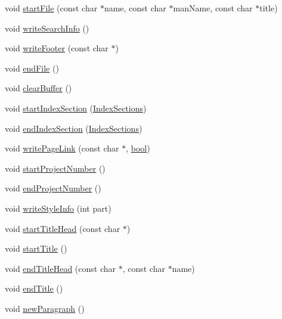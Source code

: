 \begin{DoxyCompactItemize}
\item 
void \hyperlink{class_r_t_f_generator_a8f2619c60318190461202909303cdd64}{start\+File} (const char $\ast$name, const char $\ast$man\+Name, const char $\ast$title)
\item 
void \hyperlink{class_r_t_f_generator_a2bbe7d3fc41e5d54ad3dd1549ead2a50}{write\+Search\+Info} ()
\item 
void \hyperlink{class_r_t_f_generator_a2f413cd0dd806141416ba6b3b165f6ff}{write\+Footer} (const char $\ast$)
\item 
void \hyperlink{class_r_t_f_generator_aa98dac9076dd84b77670d69a119e6745}{end\+File} ()
\item 
void \hyperlink{class_r_t_f_generator_ab9806cf1797d83c7f449598c690ed43d}{clear\+Buffer} ()
\item 
void \hyperlink{class_r_t_f_generator_a861891a016c0c096a0e218017cf4865f}{start\+Index\+Section} (\hyperlink{index_8h_aec03800047ada46460eb75113cfee322}{Index\+Sections})
\item 
void \hyperlink{class_r_t_f_generator_ab7173f5690754ef15cbcdb256b05d657}{end\+Index\+Section} (\hyperlink{index_8h_aec03800047ada46460eb75113cfee322}{Index\+Sections})
\item 
void \hyperlink{class_r_t_f_generator_a1a5220608be92b1cf666ec6d77df6c15}{write\+Page\+Link} (const char $\ast$, \hyperlink{qglobal_8h_a1062901a7428fdd9c7f180f5e01ea056}{bool})
\item 
void \hyperlink{class_r_t_f_generator_a3f1521b0b98bf4b73eb1bb77ed1ec191}{start\+Project\+Number} ()
\item 
void \hyperlink{class_r_t_f_generator_a9ccc768a46f45f0f49bb41f25f108dab}{end\+Project\+Number} ()
\item 
void \hyperlink{class_r_t_f_generator_a0aaaee80191b38b7e17a7c460b1bc0ed}{write\+Style\+Info} (int part)
\item 
void \hyperlink{class_r_t_f_generator_a34dec5a4a5407eab6924ed8245581198}{start\+Title\+Head} (const char $\ast$)
\item 
void \hyperlink{class_r_t_f_generator_af0954cd0854f60839004dda1b134f7e3}{start\+Title} ()
\item 
void \hyperlink{class_r_t_f_generator_a881f413de3acd54c6bd5977c4add08d4}{end\+Title\+Head} (const char $\ast$, const char $\ast$name)
\item 
void \hyperlink{class_r_t_f_generator_a9cc9028ce4b47900b45798c2d2006eca}{end\+Title} ()
\item 
void \hyperlink{class_r_t_f_generator_a19bbf6e08804ee457c7aa9e07b833ba0}{new\+Paragraph} ()

\end{DoxyCompactItemize}
